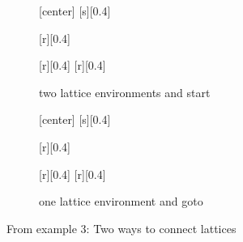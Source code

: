 \documentclass[a4paper]{scrartcl}
\begin{document}
\begin{figure}
\centering
\begin{subfigure}[b]{.45\textwidth}
\centering
 \begin{lattice}
    \turnlabels %
    [center] %
    [s][0.4]
  \end{lattice}
  \begin{lattice}[1][overlay]
    [r][0.4]
    \begin{fade} %
      [r][0.4]
      [r][0.4]
    \end{fade}
  \end{lattice}
 \caption{two lattice environments and start}
\end{subfigure}
%
\begin{subfigure}[b]{.45\textwidth}
  \centering
  \begin{lattice}
    \turnlabels %
    [center] %
    [s][0.4]

    \turnlabels %
    [r][0.4]
    \begin{fade} %
      [r][0.4]
      [r][0.4]
    \end{fade}
  \end{lattice}
  \caption{one lattice environment and goto}
\end{subfigure}
\caption{From example 3: Two ways to connect lattices}
\label{fig:twoways}
\end{figure}
\end{document}
